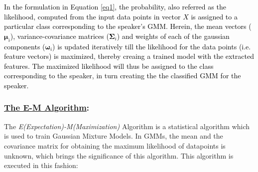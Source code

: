 \documentclass{article}
\begin{document}
\textcolor{black}{In the formulation in Equation \ref{eq1}, the probability, also referred as the likelihood, computed from the input data points in vector $X$ is assigned to a particular class corresponding to the speaker's GMM. Herein, the mean vectors ($\bm \mu_i$), variance-covariance matrices ($\bm\Sigma_i$) and weights of each of the gaussian components ($\bm \omega_i$) is updated iteratively till the likelihood for the data points (i.e. feature vectors) is maximized, %
thereby creaing a trained model with the extracted features. The maximized likelihood will thus be assigned to the class corresponding to the speaker, in turn creating the the classified GMM for the speaker.} 
\subsubsection{\underline{The E-M Algorithm}:} The \textit{E(Expectation)-M(Maximization)} Algorithm is a statistical algorithm which is used to train Gaussian Mixture Models. In GMMs, the mean and the covariance matrix for obtaining the maximum likelihood of datapoints is unknown, which brings the significance of this algorithm. This algorithm is executed in this fashion:
\end{document}
